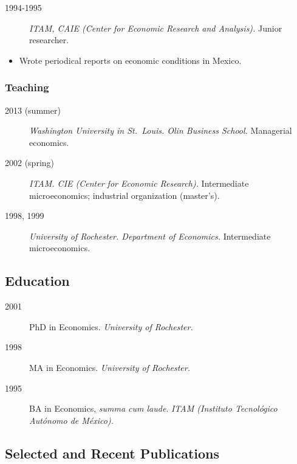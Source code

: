 \documentclass[10pt,]{article}
\def\tightlist{}
\begin{document}
\begin{description}
\tightlist
\item[1994-1995]
\emph{ITAM, CAIE (Center for Economic Research and Analysis).} Junior
researcher.
\end{description}

\begin{itemize}
\tightlist
\item
  Wrote periodical reports on economic conditions in Mexico.
\end{itemize}

\hypertarget{teaching}{%
\subsubsection{Teaching}\label{teaching}}

\begin{description}
\tightlist
\item[2013 (summer)]
\emph{Washington University in St.~Louis. Olin Business School.}
Managerial economics.
\item[2002 (spring)]
\emph{ITAM. CIE (Center for Economic Research).} Intermediate
microeconomics; industrial organization (master's).
\item[1998, 1999]
\emph{University of Rochester. Department of Economics.} Intermediate
microeconomics.
\end{description}

\hypertarget{education}{%
\subsection{Education}\label{education}}

\begin{description}
\tightlist
\item[2001]
PhD in Economics. \emph{University of Rochester.}
\item[1998]
MA in Economics. \emph{University of Rochester.}
\item[1995]
BA in Economics, \emph{summa cum laude}. \emph{ITAM (Instituto
Tecnológico Autónomo de México).}
\end{description}

\hypertarget{selected-and-recent-publications}{%
\subsection{Selected and Recent
Publications}\label{selected-and-recent-publications}}
\end{document}
